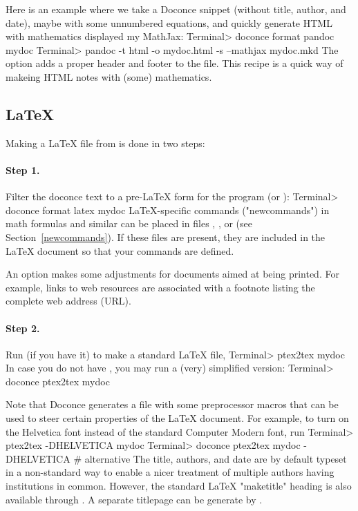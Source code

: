 \documentclass[%
oneside,                 %
final,                   %
10pt]{article}
\begin{document}
Here is an example where we take a Doconce snippet (without title, author,
and date), maybe with some unnumbered equations, and quickly generate
HTML with mathematics displayed my MathJax:
\bsys
Terminal> doconce format pandoc mydoc
Terminal> pandoc -t html -o mydoc.html -s --mathjax mydoc.mkd
\esys
The  option adds a proper header and footer to the  file.
This recipe is a quick way of makeing HTML notes with (some) mathematics.


\subsection{{\LaTeX}}

Making a {\LaTeX} file  from  is done in two steps:

\paragraph{Step 1.}
Filter the doconce text to a pre-LaTeX form  for
the  program (or ):
\bsys
Terminal> doconce format latex mydoc
\esys
LaTeX-specific commands ("newcommands") in math formulas and similar
can be placed in files , , or
 (see Section~\ref{newcommands}).
If these files are present, they are included in the {\LaTeX} document
so that your commands are defined.

An option  makes some adjustments for documents
aimed at being printed. For example, links to web resources are
associated with a footnote listing the complete web address (URL).

\paragraph{Step 2.}
Run  (if you have it) to make a standard {\LaTeX} file,
\bsys
Terminal> ptex2tex mydoc
\esys
In case you do not have , you may run a (very) simplified version:
\bsys
Terminal> doconce ptex2tex mydoc
\esys

Note that Doconce generates a  file with some preprocessor macros
that can be used to steer certain properties of the {\LaTeX} document.
For example, to turn on the Helvetica font instead of the standard
Computer Modern font, run
\bsys
Terminal> ptex2tex -DHELVETICA mydoc
Terminal> doconce ptex2tex mydoc -DHELVETICA  # alternative
\esys
The title, authors, and date are by default typeset in a non-standard
way to enable a nicer treatment of multiple authors having
institutions in common. However, the standard {\LaTeX} "maketitle" heading
is also available through .
A separate titlepage can be generate by
.
\end{document}
